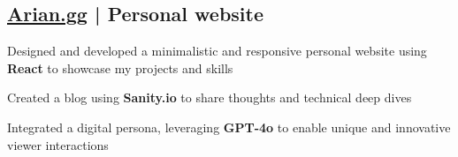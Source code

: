 


\subsection{\href{https://arian.gg}{Arian.gg} | Personal website }
\begin{zitemize}
    \item Designed and developed a minimalistic and responsive personal website using \textbf{React} to showcase my projects and skills
    \item Created a blog using \textbf{Sanity.io} to share thoughts and technical deep dives
    \item Integrated a digital persona, leveraging \textbf{GPT-4o} to enable unique and innovative viewer interactions

\end{zitemize}


